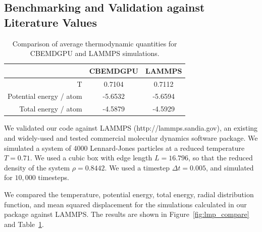 \documentclass[12pt]{article}
\begin{document}
\subsection{Benchmarking and Validation against Literature Values}

\begin{table}[H]
\begin{centering}
	\begin{tabular}{| r | c | c |}
		\hline
		 & CBEMDGPU & LAMMPS \\
		 \hline
		 T & 0.7104 & 0.7112 \\
		 \hline
		 Potential energy / atom & -5.6532 & -5.6594 \\
		 \hline
		 Total energy / atom & -4.5879 & -4.5929 \\
		 \hline
	\end{tabular}
	\caption{Comparison of average thermodynamic quantities for CBEMDGPU and LAMMPS simulations.}
	\label{table:lmp_compare}
\end{centering}
\end{table}

We validated our code against LAMMPS \cite{Plimpton1995} (http://lammps.sandia.gov), an existing and widely-used and tested commercial molecular dynamics software package.
%
We simulated a system of 4000 Lennard-Jones particles at a reduced temperature $T=0.71$.
%
We used a cubic box with edge length $L=16.796$, so that the reduced density of the system $\rho = 0.8442$.
%
We used a timestep $\Delta t=0.005$, and simulated for $10,000$ timesteps.


We compared the temperature, potential energy, total energy, radial distribution function, and mean squared displacement for the simulations calculated in our package against LAMMPS.
%
The results are shown in Figure~\ref{fig:lmp_compare} and Table~\ref{table:lmp_compare}.
%
\end{document}
